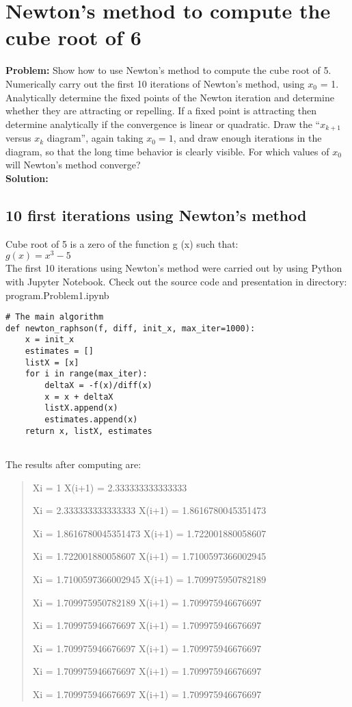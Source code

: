 \newpage
\section{Newton's method to compute the cube root of 6}
\label{sec:newton_s_method_to_compute_the_cube_root_of_6}

\textbf{Problem:}
Show how to use Newton’s method to compute the cube root
of 5. Numerically carry out the first 10 iterations of Newton’s method, using $x_{0}$ = 1. 
Analytically determine the fixed points of the Newton iteration and determine whether they are attracting or repelling.
If a fixed point is attracting then determine analytically if the convergence is linear or quadratic.
Draw the “$x_{k+1}$ versus $x_{k}$ diagram”, again taking $x_{0} = 1$, and draw enough iterations in the diagram, so that the long time behavior is clearly visible. 
For which values of $x_{0}$ will Newton’s method converge?
\\
\textbf{Solution:}
\subsection{10 first iterations using Newton's method}
\label{10iterations}
Cube root of 5 is a zero of the function g (x) such that:\\
$g(x) = x^{3} - 5$\\

The first 10 iterations using Newton's method were carried out by using Python with Jupyter Notebook. Check out the source code and presentation in directory: program.Problem1.ipynb 

\begin{lstlisting}
# The main algorithm
def newton_raphson(f, diff, init_x, max_iter=1000):
    x = init_x
    estimates = []
    listX = [x]
    for i in range(max_iter):
        deltaX = -f(x)/diff(x)
        x = x + deltaX
        listX.append(x)
        estimates.append(x)
    return x, listX, estimates
    
\end{lstlisting}

The results after computing are:
\begin{quote}
Xi =  1
X(i+1) =  2.333333333333333 

Xi =  2.333333333333333
X(i+1) =  1.8616780045351473 

Xi =  1.8616780045351473
X(i+1) =  1.722001880058607 

Xi =  1.722001880058607
X(i+1) =  1.7100597366002945 

Xi =  1.7100597366002945
X(i+1) =  1.709975950782189 

Xi =  1.709975950782189
X(i+1) =  1.709975946676697 

Xi =  1.709975946676697
X(i+1) =  1.709975946676697 

Xi =  1.709975946676697
X(i+1) =  1.709975946676697 

Xi =  1.709975946676697
X(i+1) =  1.709975946676697 

Xi =  1.709975946676697
X(i+1) =  1.709975946676697
\end{quote}

